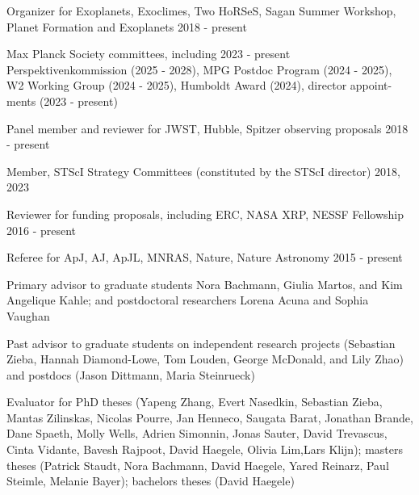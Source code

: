 \documentclass[12pt,letterpaper]{article}
\begin{document}
\begin{list}{}{\cvlist}
    \item Organizer for Exoplanets, Exoclimes, Two HoRSeS, Sagan Summer Workshop, Planet Formation and Exoplanets \hfill 2018 - present
    \item Max Planck Society committees, including \hfill 2023 - present\\
        \hspace*{0.5em}Perspektivenkommission (2025 - 2028), MPG Postdoc Program (2024 - 2025),\\
        \hspace*{0.5em}W2 Working Group (2024 - 2025), Humboldt Award (2024), director appoint-\\
        \hspace*{0.5em}ments (2023 - present)
    \item Panel member and reviewer for JWST, Hubble, Spitzer observing proposals \hfill 2018 - present
    \item Member, STScI Strategy Committees (constituted by the STScI director) \hfill 2018, 2023 
    \item Reviewer for funding proposals, including ERC, NASA XRP, NESSF Fellowship \hfill 2016 - present
    \item Referee for ApJ, AJ, ApJL, MNRAS, Nature, Nature Astronomy \hfill 2015 - present
\end{list}

\begin{list}{}{\cvlist}
\item Primary advisor to graduate students Nora Bachmann, Giulia Martos, and Kim Angelique Kahle; and postdoctoral researchers Lorena Acuna and Sophia Vaughan 
\item Past advisor to graduate students on independent research projects (Sebastian Zieba, Hannah Diamond-Lowe, Tom Louden, George McDonald, and Lily Zhao) and postdocs (Jason Dittmann, Maria Steinrueck)
\item Evaluator for PhD theses (Yapeng Zhang, Evert Nasedkin, Sebastian Zieba, Mantas Zilinskas, Nicolas Pourre, Jan Henneco, Saugata Barat, Jonathan Brande, Dane Spaeth, Molly Wells, Adrien Simonnin, Jonas Sauter, David Trevascus, Cinta Vidante, Bavesh Rajpoot, David Haegele, Olivia Lim,Lars Klijn); masters theses (Patrick Staudt, Nora Bachmann, David Haegele, Yared Reinarz, Paul Steimle, Melanie Bayer); bachelors theses (David Haegele)

\end{list}
\end{document}
